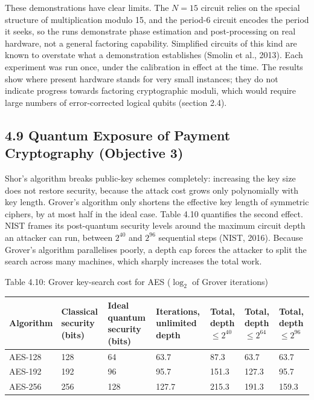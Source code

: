 \documentclass[12pt,oneside]{report}
\begin{document}
These demonstrations have clear limits. The $N = 15$ circuit relies on the special structure of multiplication modulo 15, and the period-6 circuit encodes the period it seeks, so the runs demonstrate phase estimation and post-processing on real hardware, not a general factoring capability. Simplified circuits of this kind are known to overstate what a demonstration establishes (Smolin et al., 2013). Each experiment was run once, under the calibration in effect at the time. The results show where present hardware stands for very small instances; they do not indicate progress towards factoring cryptographic moduli, which would require large numbers of error-corrected logical qubits (section 2.4).
\par

\subsection*{4.9 Quantum Exposure of Payment Cryptography (Objective 3)}

Shor's algorithm breaks public-key schemes completely: increasing the key size does not restore security, because the attack cost grows only polynomially with key length. Grover's algorithm only shortens the effective key length of symmetric ciphers, by at most half in the ideal case. Table 4.10 quantifies the second effect. NIST frames its post-quantum security levels around the maximum circuit depth an attacker can run, between $2^{40}$ and $2^{96}$ sequential steps (NIST, 2016). Because Grover's algorithm parallelises poorly, a depth cap forces the attacker to split the search across many machines, which sharply increases the total work.
\par

\label{tab:4.10}Table 4.10: Grover key-search cost for AES ($\log_{2}$ of Grover iterations)
\par

\begin{center}\footnotesize\begin{tabularx}{\textwidth}{|W|W|W|W|W|W|W|}\hline
Algorithm & Classical security (bits) & Ideal quantum security (bits) & Iterations, unlimited depth & Total, depth $\le 2^{40}$ & Total, depth $\le 2^{64}$ & Total, depth $\le 2^{96}$ \\\hline
AES-128 & 128 & 64 & 63.7 & 87.3 & 63.7 & 63.7 \\\hline
AES-192 & 192 & 96 & 95.7 & 151.3 & 127.3 & 95.7 \\\hline
AES-256 & 256 & 128 & 127.7 & 215.3 & 191.3 & 159.3 \\\hline\end{tabularx}\end{center}
\end{document}
